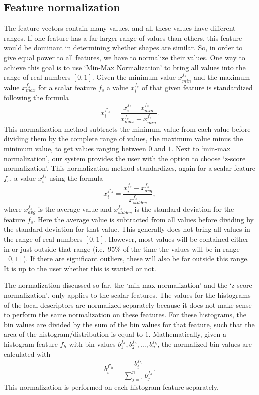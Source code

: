 \subsection{Feature normalization}
The feature vectors contain many values, and all these values have different ranges.
If one feature has a far larger range of values than others, this feature would be dominant in determining whether shapes are similar.
So, in order to give equal power to all features, we have to normalize their values.
One way to achieve this goal is to use `Min-Max Normalization' to bring all values into the range of real numbers $[0, 1]$.
Given the minimum value $x_{min}^{f_s}$ and the maximum value $x_{max}^{f_s}$ for a scalar feature ${f_s}$ a value $x_i^{f_s}$ of that given feature is standardized following the formula
\begin{equation}
    x_i^{f'_s} = \frac{x_i^{f_s} - x_{min}^{f_s}}{x_{max}^{f_s} - x_{min}^{f_s}}.
\end{equation} 
This normalization method subtracts the minimum value from each value before dividing them by the complete range of values, the maximum value minus the minimum value, to get values ranging between $0$ and $1$.
Next to `min-max normalization', our system provides the user with the option to choose `z-score normalization'.
This normalization method standardizes, again for a scalar feature ${f_s}$, a value $x_i^{f_s}$ using the formula
\begin{equation}
    x_i^{f'_s} = \frac{x_i^{f_s} - x_{avg}^{f_s}}{x_{stddev}^{f_s}},
\end{equation} 
where $x_{avg}^{f_s}$ is the average value and $x_{stddev}^{f_s}$ is the standard deviation for the feature ${f_s}$.
Here the average value is subtracted from all values before dividing by the standard deviation for that value.
This generally does not bring all values in the range of real numbers $[0, 1]$.
However, most values will be contained either in or just outside that range (i.e.\ 95\% of the time the values will be in range $[0,1]$).
If there are significant outliers, these will also be far outside this range.
It is up to the user whether this is wanted or not.

The normalization discussed so far, the `min-max normalization' and the `z-score normalization', only applies to the scalar features.
The values for the histograms of the local descriptors are normalized separately because it does not make sense to perform the same normalization on these features.
For these histograms, the bin values are divided by the sum of the bin values for that feature, such that the area of the histogram/distribution is equal to $1$.
Mathematically, given a histogram feature $f_h$ with bin values $b_1^{f_h}, b_2^{f_h}, \dots, b_n^{f_h}$, the normalized bin values are calculated with
\begin{equation}
    b_i^{f'_h} = \frac{b_i^{f_h}}{\sum_{j=1}^n b_j^{f_h}}.
\end{equation}
This normalization is performed on each histogram feature separately.

